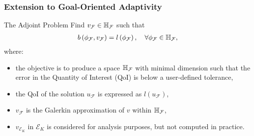 \begin{frame}
\frametitle{Extension to Goal-Oriented Adaptivity}
    \begin{block}{The Adjoint Problem}
        Find $v_{\mathcal{F}}\in \mathbb{H}_{\mathcal{F}}$ such that
  	\begin{align}
    	\label{eq:adjointH}
    	b\left(\phi_{\mathcal{F}},v_{\mathcal{F}}\right)=l\left(\phi_{\mathcal{F}}\right), \quad \forall \phi_{\mathcal{F}} \in \mathbb{H}_{\mathcal{F}},
  	\end{align}
        where:
        \begin{itemize}
            \item the objective is to produce a space $\mathbb{H}_{\mathcal{F}}$ with minimal dimension such that the error in the Quantity of Interest (QoI) is below a user-defined tolerance,
            \item the QoI of the solution $u_{\mathcal{F}}$ is expressed as $l(u_{\mathcal{F}})$,
            \item $v_{\mathcal{F}}$ is the Galerkin approximation of $v$ within $\mathbb{H}_{\mathcal{F}}$,
            \item $v_{\mathcal{E}_K}$ in $\mathcal{E}_K$ is considered for analysis purposes, but not computed in practice.
        \end{itemize}
    \end{block}     
\end{frame}

